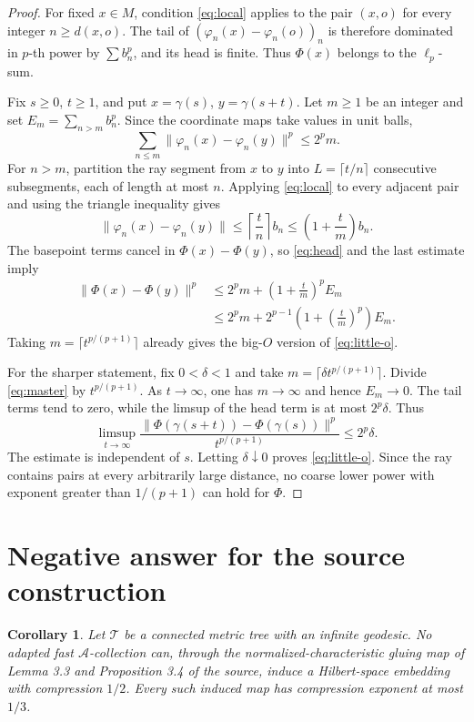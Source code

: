\documentclass[11pt]{article}
\newtheorem{corollary}[theorem]{Corollary}
\begin{document}
\begin{proof}
For fixed $x\in M$, condition \eqref{eq:local} applies to the pair $(x,o)$
for every integer $n\ge d(x,o)$.  The tail of
$(\varphi_n(x)-\varphi_n(o))_n$ is therefore dominated in $p$-th power by
$\sum b_n^p$, and its head is finite.  Thus $\Phi(x)$ belongs to the
$\ell_p$-sum.

Fix $s\ge0$, $t\ge1$, and put $x=\gamma(s)$,
$y=\gamma(s+t)$.  Let $m\ge1$ be an integer and set
$E_m=\sum_{n>m}b_n^p$.  Since the coordinate maps take values in unit balls,
\begin{equation}\label{eq:head}
 \sum_{n\le m}\|\varphi_n(x)-\varphi_n(y)\|^p\le2^pm.
\end{equation}
For $n>m$, partition the ray segment from $x$ to $y$ into
$L=\lceil t/n\rceil$ consecutive subsegments, each of length at most $n$.
Applying \eqref{eq:local} to every adjacent pair and using the triangle
inequality gives
\[
 \|\varphi_n(x)-\varphi_n(y)\|
 \le \left\lceil\frac tn\right\rceil b_n
 \le \left(1+\frac tm\right)b_n.
\]
The basepoint terms cancel in $\Phi(x)-\Phi(y)$, so \eqref{eq:head} and the
last estimate imply
\begin{align}
 \|\Phi(x)-\Phi(y)\|^p
 &\le 2^pm+\left(1+\frac tm\right)^pE_m \label{eq:master}\\
 &\le 2^pm+2^{p-1}\left(1+\left(\frac tm\right)^p\right)E_m.\nonumber
\end{align}
Taking $m=\lceil t^{p/(p+1)}\rceil$ already gives the big-$O$ version of
\eqref{eq:little-o}.

For the sharper statement, fix $0<\delta<1$ and take
$m=\lceil\delta t^{p/(p+1)}\rceil$.  Divide \eqref{eq:master} by
$t^{p/(p+1)}$.  As $t\to\infty$, one has $m\to\infty$ and hence
$E_m\to0$.  The tail terms tend to zero, while the limsup of the head term is
at most $2^p\delta$.  Thus
\[
 \limsup_{t\to\infty}
 \frac{\|\Phi(\gamma(s+t))-\Phi(\gamma(s))\|^p}
      {t^{p/(p+1)}}
 \le2^p\delta.
\]
The estimate is independent of $s$.  Letting $\delta\downarrow0$ proves
\eqref{eq:little-o}.  Since the ray contains pairs at every arbitrarily large
distance, no coarse lower power with exponent greater than $1/(p+1)$ can
hold for $\Phi$.
\end{proof}

\section{Negative answer for the source construction}

\begin{corollary}\label{cor:answer}
Let $\mathcal T$ be a connected metric tree with an infinite geodesic.  No
adapted fast $\mathcal A$-collection can, through the normalized-characteristic
gluing map of Lemma 3.3 and Proposition 3.4 of the source, induce a
Hilbert-space embedding with compression $1/2$.  Every such induced map has
compression exponent at most $1/3$.
\end{corollary}
\end{document}
